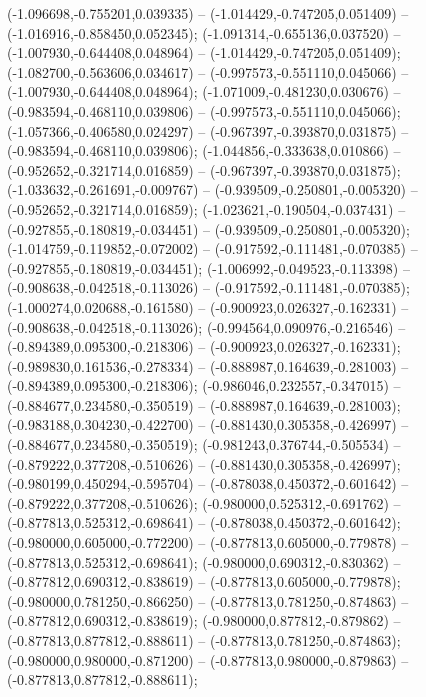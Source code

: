  (-1.096698,-0.755201,0.039335) -- (-1.014429,-0.747205,0.051409) -- (-1.016916,-0.858450,0.052345);
 (-1.091314,-0.655136,0.037520) -- (-1.007930,-0.644408,0.048964) -- (-1.014429,-0.747205,0.051409);
 (-1.082700,-0.563606,0.034617) -- (-0.997573,-0.551110,0.045066) -- (-1.007930,-0.644408,0.048964);
 (-1.071009,-0.481230,0.030676) -- (-0.983594,-0.468110,0.039806) -- (-0.997573,-0.551110,0.045066);
 (-1.057366,-0.406580,0.024297) -- (-0.967397,-0.393870,0.031875) -- (-0.983594,-0.468110,0.039806);
 (-1.044856,-0.333638,0.010866) -- (-0.952652,-0.321714,0.016859) -- (-0.967397,-0.393870,0.031875);
 (-1.033632,-0.261691,-0.009767) -- (-0.939509,-0.250801,-0.005320) -- (-0.952652,-0.321714,0.016859);
 (-1.023621,-0.190504,-0.037431) -- (-0.927855,-0.180819,-0.034451) -- (-0.939509,-0.250801,-0.005320);
 (-1.014759,-0.119852,-0.072002) -- (-0.917592,-0.111481,-0.070385) -- (-0.927855,-0.180819,-0.034451);
 (-1.006992,-0.049523,-0.113398) -- (-0.908638,-0.042518,-0.113026) -- (-0.917592,-0.111481,-0.070385);
 (-1.000274,0.020688,-0.161580) -- (-0.900923,0.026327,-0.162331) -- (-0.908638,-0.042518,-0.113026);
 (-0.994564,0.090976,-0.216546) -- (-0.894389,0.095300,-0.218306) -- (-0.900923,0.026327,-0.162331);
 (-0.989830,0.161536,-0.278334) -- (-0.888987,0.164639,-0.281003) -- (-0.894389,0.095300,-0.218306);
 (-0.986046,0.232557,-0.347015) -- (-0.884677,0.234580,-0.350519) -- (-0.888987,0.164639,-0.281003);
 (-0.983188,0.304230,-0.422700) -- (-0.881430,0.305358,-0.426997) -- (-0.884677,0.234580,-0.350519);
 (-0.981243,0.376744,-0.505534) -- (-0.879222,0.377208,-0.510626) -- (-0.881430,0.305358,-0.426997);
 (-0.980199,0.450294,-0.595704) -- (-0.878038,0.450372,-0.601642) -- (-0.879222,0.377208,-0.510626);
 (-0.980000,0.525312,-0.691762) -- (-0.877813,0.525312,-0.698641) -- (-0.878038,0.450372,-0.601642);
 (-0.980000,0.605000,-0.772200) -- (-0.877813,0.605000,-0.779878) -- (-0.877813,0.525312,-0.698641);
 (-0.980000,0.690312,-0.830362) -- (-0.877812,0.690312,-0.838619) -- (-0.877813,0.605000,-0.779878);
 (-0.980000,0.781250,-0.866250) -- (-0.877813,0.781250,-0.874863) -- (-0.877812,0.690312,-0.838619);
 (-0.980000,0.877812,-0.879862) -- (-0.877813,0.877812,-0.888611) -- (-0.877813,0.781250,-0.874863);
 (-0.980000,0.980000,-0.871200) -- (-0.877813,0.980000,-0.879863) -- (-0.877813,0.877812,-0.888611);
